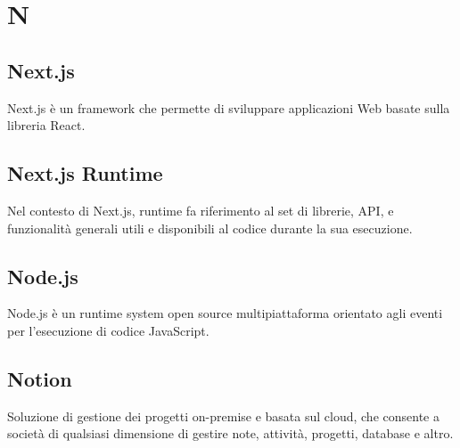 \chapter{N}

\section{Next.js}\label{sec:Nextjs}
Next.js è un framework che permette di sviluppare applicazioni Web basate sulla libreria React.

\section{Next.js Runtime}\label{sec:Nextjs Runtime}
Nel contesto di Next.js, runtime fa riferimento al set di librerie, API, e funzionalità generali utili e disponibili al codice durante la sua esecuzione.


\section{Node.js}\label{sec:Nodejs}
Node.js è un runtime system open source multipiattaforma orientato agli eventi per l'esecuzione di codice JavaScript.

\section{Notion}
Soluzione di gestione dei progetti on-premise e basata sul cloud, che consente a società di qualsiasi dimensione di gestire note, attività, progetti, database e altro.